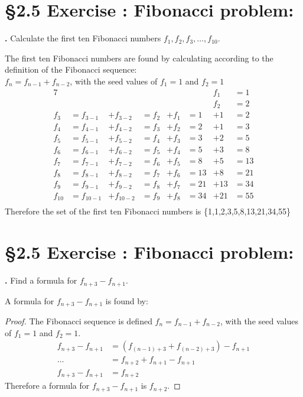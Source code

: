 \documentclass[a4paper,11pt]{article}
\begin{document}
\section*{\S 2.5 Exercise : Fibonacci problem:}
\setcounter{SubsectionCounter}{2}
\textbf{.}
Calculate the first ten Fibonacci numbers \(f_1,f_2,f_3,\ldots,f_{10}\).
\begin{theorem1}
 The first ten Fibonacci numbers are found by calculating according to the definition of the Fibonacci 
 sequence:\\
\(f_n = f_{n-1} + f_{n-2}\), with the seed values of \(f_1 = 1\) and \(f_2 = 
1\)\\
\begin{alignat*}{7}
& & & & & & f_1 &= 1\\
& & & & & & f_2 &= 2\\
f_3 &= f_{3-1} &+ f_{3-2} &= f_{2} &+ f_{1} &= 1 &+ 1 &= 2\\
f_4 &= f_{4-1} &+ f_{4-2} &= f_{3} &+ f_{2} &= 2 &+ 1 &= 3\\
f_5 &= f_{5-1} &+ f_{5-2} &= f_{4} &+ f_{3} &= 3 &+ 2 &= 5\\
f_6 &= f_{6-1} &+ f_{6-2} &= f_{5} &+ f_{4} &= 5 &+ 3 &= 8\\
f_7 &= f_{7-1} &+ f_{7-2} &= f_{6} &+ f_{5} &= 8 &+ 5 &= 13\\
f_8 &= f_{8-1} &+ f_{8-2} &= f_{7} &+ f_{6} &= 13 &+ 8 &= 21\\
f_9 &= f_{9-1} &+ f_{9-2} &= f_{8} &+ f_{7} &= 21 &+ 13 &= 34\\
f_{10} &= f_{10-1} &+ f_{10-2} &= f_{9} &+ f_{8} &= 34 &+ 21 &= 55\\
\end{alignat*}
Therefore the set of the first ten Fibonacci numbers is \{1,1,2,3,5,8,13,21,34,55\}
\end{theorem1}

\newpage

\setcounter{ProblemCounter}{4}
\section*{\S 2.5 Exercise : Fibonacci problem:}
\setcounter{SubsectionCounter}{3}
\textbf{.}
Find a formula for \(f_{n+3}-f_{n+1}\).
\begin{theorem1}
 A formula for \(f_{n+3}-f_{n+1}\) is found by:
 \begin{proof}
The Fibonacci sequence is defined \(f_n = f_{n-1} + f_{n-2}\), with the seed values of \(f_1 = 1\) and \(f_2 = 
1\).\\
\begin{align*}
  f_{n+3}-f_{n+1} &= {(f_{{(n-1)+3}}+f_{{(n-2)}+3})} - f_{n+1}\\
  \ldots &= f_{n+2}+f_{n+1} - f_{n+1}\\
  f_{n+3}-f_{n+1} &= f_{n+2}
\end{align*}
Therefore a formula for \(f_{n+3}-f_{n+1}\) is \(f_{n+2}\).
\end{proof}  
\end{theorem1}
\end{document}
